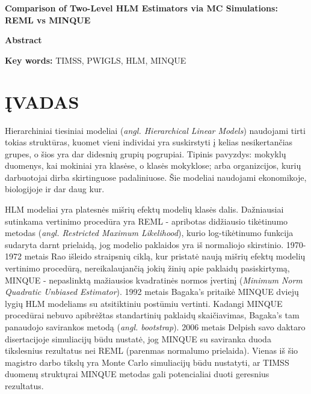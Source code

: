 \documentclass[12pt,a4paper]{article}
\begin{document}
\begin{center}{\large\textbf{Comparison of Two-Level HLM Estimators via MC Simulations: REML vs MINQUE}}\end{center}

\begin{small}
\vspace{2\baselineskip}
\begin{center}\textbf{Abstract}\end{center}


\vspace{\baselineskip}

\noindent\textbf{Key words:}
TIMSS, PWIGLS, HLM, MINQUE
\end{small}
\vspace{\baselineskip}

\newpage
\section{ĮVADAS}

\indent Hierarchiniai tiesiniai modeliai (\textit{angl. Hierarchical Linear Models}) naudojami tirti tokias struktūras, kuomet vieni individai yra suskirstyti į kelias nesikertančias grupes, o šios yra dar didesnių grupių pogrupiai. Tipinis pavyzdys: mokyklų duomenys, kai mokiniai yra klasėse, o klasės mokyklose; arba organizcijos, kurių darbuotojai dirba skirtinguose padaliniuose. Šie modeliai naudojami ekonomikoje, biologijoje ir dar daug kur.

\indent HLM modeliai yra platesnės mišrių efektų modelių klasės dalis. Dažniausiai sutinkama vertinimo procedūra yra REML - apribotas didžiausio tikėtinumo metodas (\textit{angl. Restricted Maximum Likelihood}), kurio log-tikėtinumo funkcija sudaryta darnt prielaidą, jog modelio paklaidos yra iš normaliojo skirstinio. 1970-1972 metais Rao išleido straipsnių ciklą, kur pristatė naują mišrių efektų modelių vertinimo procedūrą, nereikalaujančią jokių žinių apie paklaidų pasiskirtymą, MINQUE - nepaslinktą mažiausios kvadratinės normos įvertinį (\textit{Minimum Norm Quadratic Unbiased Estimator}). 
1992 metais Bagaka's pritaikė MINQUE dviejų lygių HLM modeliams su atsitiktiniu postūmiu vertinti. Kadangi MINQUE procedūrai nebuvo apibrėžtas standartinių paklaidų skaičiavimas, Bagaka's tam panaudojo savirankos metodą (\textit{angl. bootstrap}). 2006 metais Delpish savo daktaro disertacijoje simuliacijų būdu nustatė, jog MINQUE su saviranka duoda tikslesnius rezultatus nei REML (parenmas normalumo prielaida). Vienas iš šio magistro darbo tikslų yra Monte Carlo simuliacijų būdu nustatyti, ar TIMSS duomenų struktųrai MINQUE metodas gali potencialiai duoti geresnius rezultatus.
\end{document}

